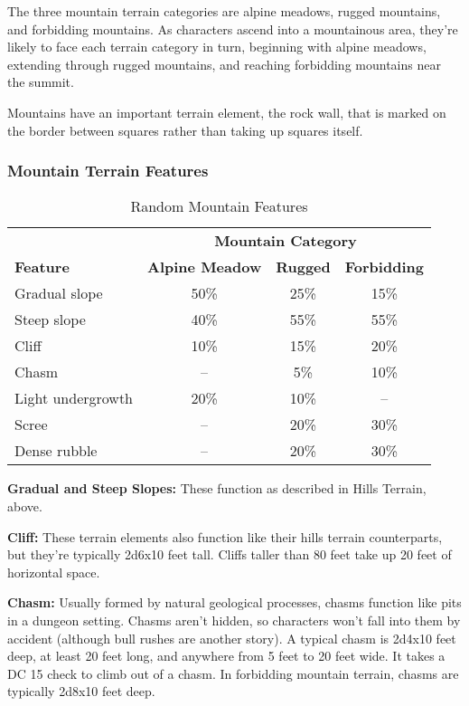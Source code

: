 The three mountain terrain categories are alpine meadows, rugged mountains, and 
forbidding mountains. As characters ascend into a mountainous area, they're likely 
to face each terrain category in turn, beginning with alpine meadows, extending 
through rugged mountains, and reaching forbidding mountains near the summit.

Mountains have an important terrain element, the rock wall, that is marked on the 
border between squares rather than taking up squares itself. 

\subsubsection{Mountain Terrain Features}

\begin{table}[htb]
\caption{Random Mountain Features}
\centering
\begin{tabular}{l c c c}
 & \multicolumn{3}{c}{\textbf{Mountain Category}}\\
\textbf{Feature} & \textbf{Alpine Meadow} & \textbf{Rugged} & \textbf{Forbidding}\\
Gradual slope & 50\% & 25\% & 15\%\\
Steep slope & 40\% & 55\% & 55\%\\
Cliff & 10\% & 15\% & 20\%\\
Chasm & -- & 5\% & 10\%\\
Light undergrowth & 20\% & 10\% & --\\
Scree & -- & 20\% & 30\%\\
Dense rubble & -- & 20\% & 30\%\\
\end{tabular}
\end{table}

\textbf{Gradual and Steep Slopes:} These function as described in Hills Terrain, 
above.

\textbf{Cliff:} These terrain elements also function like their hills terrain counterparts, 
but they're typically 2d6x10 feet tall. Cliffs taller than 80 
feet take up 20 feet of horizontal space.

\textbf{Chasm:} Usually formed by natural geological processes, chasms function 
like pits in a dungeon setting. Chasms aren't hidden, so characters won't fall 
into them by accident (although bull rushes are another story). A typical chasm 
is 2d4x10 feet deep, at least 20 feet long, and anywhere from 
5 feet to 20 feet wide. It takes a DC 15  check to climb out of a chasm. In 
forbidding mountain terrain, chasms are typically 2d8x10 feet 
deep.

